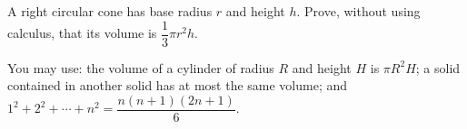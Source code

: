 A right circular cone has base radius $r$ and height $h$. Prove, without using calculus, that its volume is $\dfrac13\pi r^2h$.

You may use: the volume of a cylinder of radius $R$ and height $H$ is $\pi R^2H$; a solid contained in another solid has at most the same volume; and $1^2+2^2+\cdots+n^2=\dfrac{n(n+1)(2n+1)}{6}$.
